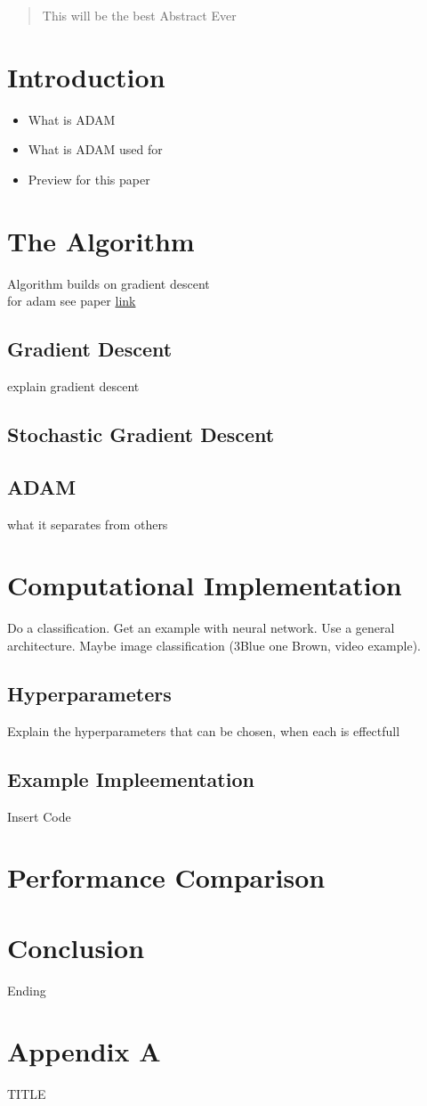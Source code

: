 \documentclass[journal]{IEEEtran}
\begin{document}
\tableofcontents 
\vspace{1.5cm}

\begin{abstract}
    This will be the best Abstract Ever 
\end{abstract}

\section{Introduction}
\begin{itemize}
    \item What is ADAM
    \item What is ADAM used for
    \item Preview for this paper
\end{itemize}


\section{The Algorithm}
Algorithm builds on gradient descent\\
for adam see paper \href{https://arxiv.org/abs/1412.6980}{link}
\subsection{Gradient Descent}
explain gradient descent
\subsection{Stochastic Gradient Descent}
\subsection{ADAM}
what it separates from others


\section{Computational Implementation}
Do a classification.  
Get an example with neural network. Use a general architecture. Maybe image classification (3Blue one Brown, video example).
\subsection{Hyperparameters}
Explain the hyperparameters that can be chosen, when each is effectfull
\subsection{Example Impleementation}
Insert Code

\section{Performance Comparison}

 
\section{Conclusion}
Ending




\onecolumn
\newpage
\pagestyle{fancy}

\section{Appendix A}
\centering TITLE
\end{document}
